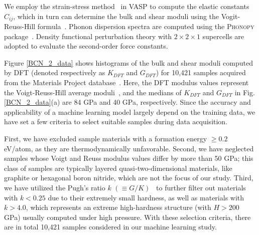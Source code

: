	
	We employ the strain-stress method~\cite{PhysRevB.65.104104} in VASP to compute the elastic constants $C_{ij}$,
	which in turn can determine the bulk and shear moduli using the Vogit-Reuss-Hill formula~\cite{voigt1928lehrbuch, reuss1929berechnung, hill1952elastic}.
	Phonon dispersion spectra are computed using the \textsc{Phonopy} package~\cite{phonopy}.
	Density functional perturbation theory with $2\times 2\times 1$ supercells are adopted to evaluate the second-order force constants. 
	
    

	Figure \ref{BCN_2_data} shows histograms of the bulk and shear moduli computed by DFT (denoted respectively as $K_{DFT}$ and $G_{DFT}$) for 10,421 samples acquired from the Materials Project database~\cite{MP}. Here, the DFT modulus values represent the Voigt-Reuss-Hill average moduli~\cite{voigt1928lehrbuch, reuss1929berechnung, hill1952elastic}, and the medians of $K_{DFT}$ and $G_{DFT}$ in Fig. \ref{BCN_2_data}(a) are 84 GPa and 40 GPa, respectively. Since the accuracy and applicability of a machine learning model largely depend on the training data, we have set a few criteria to select suitable samples during data acquisition.
	
	First, we have excluded sample materials with a formation energy $\ge 0.2$ eV/atom, as they are thermodynamically unfavorable.
	Second, we have neglected samples whose Voigt and Reuss modulus values differ by more than 50 GPa; this class of samples are typically layered quasi-two-dimensional materials, like graphite or hexagonal boron nitride, which are not the focus of our study.
	Third, we have utilized the Pugh's ratio $k$ $(\equiv G/K)$~\cite{Pugh} to further filter out materials with $k < 0.25$ due to their extremely small hardness, as well as materials with $k > 4.0$, which represents an extreme high-hardness structure (with $H > 200$ GPa) usually computed under high pressure.
	With these selection criteria, there are in total 10,421 samples considered in our machine learning study.
	
